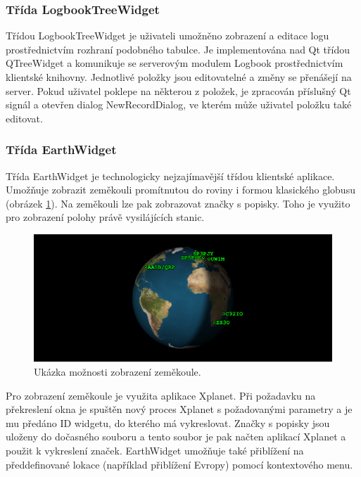 \subsubsection{Třída LogbookTreeWidget}

Třídou LogbookTreeWidget je uživateli umožněno zobrazení a editace logu prostřednictvím rozhraní podobného tabulce.
Je implementována nad Qt třídou QTreeWidget a komunikuje 
se serverovým modulem Logbook prostřednictvím klientské knihovny. Jednotlivé položky jsou editovatelné a změny se přenášejí
na server. Pokud uživatel poklepe na některou z položek, je zpracován příslušný Qt signál a otevřen dialog NewRecordDialog,
ve kterém může uživatel položku také editovat.

\subsubsection{Třída EarthWidget}

Třída EarthWidget je technologicky nejzajímavější třídou klientské aplikace. Umožňuje zobrazit zeměkouli promítnutou do roviny i 
formou klasického globusu (obrázek \ref{fig:globus}). Na zeměkouli lze pak zobrazovat značky s popisky. Toho je využito pro zobrazení polohy právě vysilájících
stanic.

\begin{figure}[h]
\centering
\includegraphics[trim=0cm 0cm 0cm 0cm, scale=0.9]{fig/ham5}
\caption{Ukázka možnosti zobrazení zeměkoule.}
\label{fig:globus}
\end{figure}

Pro zobrazení zeměkoule je využita aplikace Xplanet. Při požadavku na překreslení okna je spuštěn nový proces Xplanet
s požadovanými parametry a je mu předáno ID widgetu, do kterého má vykreslovat. Značky s popisky jsou uloženy do dočasného souboru
a tento soubor je pak načten aplikací Xplanet a použit k vykreslení značek.
EarthWidget umožňuje také přiblížení na předdefinované lokace (například přiblížení Evropy) pomocí kontextového menu.

